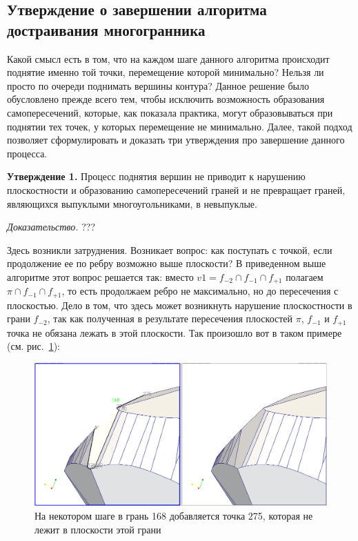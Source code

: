 \documentclass[a4paper,12pt, titlepage]{article}
\begin{document}
\subsection{Утверждение о завершении алгоритма достраивания многогранника}

\begin{flushleft}
 Какой смысл есть в том, что на каждом шаге данного алгоритма происходит поднятие именно той точки,
перемещение которой минимально? Нельзя ли просто по очереди поднимать вершины контура? Данное решение
было обусловлено прежде всего тем, чтобы исключить возможность образования самопересечений, которые,
как показала практика, могут образовываться при поднятии тех точек, у которых перемещение не минимально.
Далее, такой подход позволяет сформулировать и доказать три утверждения про завершение данного процесса.
\end{flushleft}

\begin{flushleft}
 \textbf{Утверждение 1.} Процесс поднятия вершин не приводит к нарушению плоскостности и образованию 
самопересечений граней и не превращает граней, являющихся выпуклыми многоугольниками, в невыпуклые.
\end{flushleft}

\begin{flushleft}
 \textit{Доказательство.} ???
\end{flushleft}

\begin{flushleft}
 Здесь возникли затруднения. Возникает вопрос: как поступать с точкой, если продолжение ее по ребру возможно выше плоскости?
В приведенном выше алгоритме этот вопрос решается так: вместо $v1 = f_{-2} \cap f_{-1} \cap f_{+1}$ полагаем
$\pi \cap f_{-1} \cap f_{+1}$, то есть продолжаем ребро не максимально, но до пересечения с плоскостью.
Дело в том, что здесь может возникнуть нарушение плоскостности в грани $f_{-2}$, так как полученная в результате пересечения
плоскостей $\pi$, $f_{-1}$ и $f_{+1}$ точка не обязана лежать в этой плоскости. Так произошло вот в таком примере 
(см. рис.~\ref{plane-wrong}): 
\end{flushleft}

\begin{flushleft}
  \begin{figure}[h]
    \includegraphics[width=13cm]{bugs/Plane-wrong.png}
    \caption{На некотором шаге в грань 168 добавляется точка 275, которая не лежит в плоскости этой грани}\label{plane-wrong}
  \end{figure}
\end{flushleft}
\end{document}
